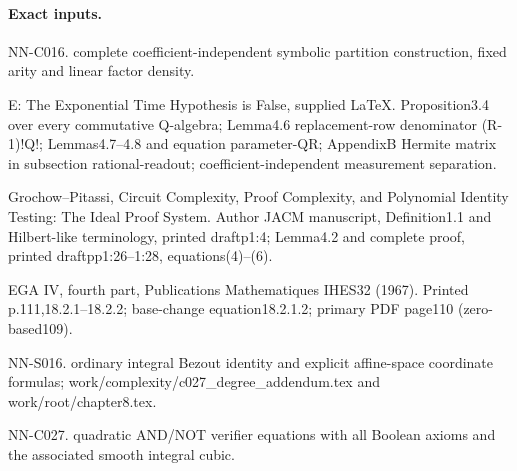 \paragraph{Exact inputs.}
NN-C016. complete coefficient-independent symbolic partition construction, fixed arity and linear factor density.

E: The Exponential Time Hypothesis is False, supplied LaTeX. Proposition3.4 over every commutative Q-algebra; Lemma4.6 replacement-row denominator (R-1)!Q!; Lemmas4.7--4.8 and equation parameter-QR; AppendixB Hermite matrix in subsection rational-readout; coefficient-independent measurement separation.

Grochow--Pitassi, Circuit Complexity, Proof Complexity, and Polynomial Identity Testing: The Ideal Proof System. Author JACM manuscript, Definition1.1 and Hilbert-like terminology, printed draftp1:4; Lemma4.2 and complete proof, printed draftpp1:26--1:28, equations(4)--(6).

EGA IV, fourth part, Publications Mathematiques IHES32 (1967). Printed p.111,18.2.1--18.2.2; base-change equation18.2.1.2; primary PDF page110 (zero-based109).

NN-S016. ordinary integral Bezout identity and explicit affine-space coordinate formulas; work/complexity/c027\_degree\_addendum.tex and work/root/chapter8.tex.

NN-C027. quadratic AND/NOT verifier equations with all Boolean axioms and the associated smooth integral cubic.

